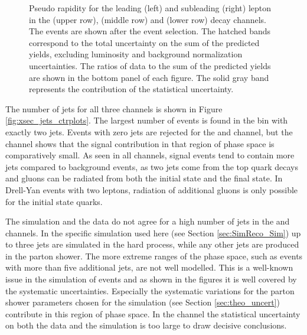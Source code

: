 \begin{figure}[htbp!]
\begin{center}
      \caption{Pseudo rapidity for the leading (left) and subleading (right)
        lepton in the \emu (upper row), \mumu (middle row) and \ee (lower row) decay channels.
        The events are shown after the
        event selection.  The hatched
        bands correspond to the total uncertainty on the sum of the
        predicted yields, 
        excluding luminosity and background
        normalization uncertainties. 
        The ratios of data to the sum of the predicted yields are
        shown in the bottom panel of each figure. The solid gray band
        represents the contribution of the statistical uncertainty.}  
       \label{fig:xsec_eta_ctrplots}
  \end{center}
\end{figure}



The number of jets for all three channels is shown in Figure \ref{fig:xsec_jets_ctrplots}.
The largest number of \ttbar events is found in the bin with exactly two jets. 
Events with zero jets are rejected for the \ee and \mumu channel, but the \emu channel shows that the signal
contribution in that region of phase space is comparatively small.
As seen in all channels, \ttbar signal events tend to contain more jets compared to background events, as two jets come from the top quark decays and gluons can be radiated from both the initial state and the final state. 
In Drell-Yan events with two leptons, radiation of additional gluons is only possible for the initial state quarks.

The simulation and the data do not agree for a high number of jets in the \emu and \mumu channels.
In the specific simulation used here (see Section \ref{sec:SimReco_Sim}) up to three jets are simulated in the hard process, while any other jets are produced in the parton shower.
The more extreme ranges of the phase space, such as events with more than five additional jets, are not well modelled.
This is a well-known issue in the simulation of \ttbar events and as shown in the figures it is well covered by the systematic uncertainties. Especially the systematic variations for the parton shower parameters chosen for the simulation
(see Section \ref{sec:theo_uncert}) contribute in this region of phase space.
In the \ee channel the statistical uncertainty on both the data and the simulation is too large to draw decisive conclusions.

